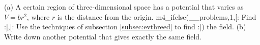 (a) A certain region of three-dimensional space has a potential that varies as
        $V=br^2$, where $r$ is the distance from the origin.
m4_ifelse(__problems,1,[:%
  Find
:],[:%
        Use the techniques of subsection \ref{subsec:evthreed}
        to find 
:])%
the field.\answercheck\hwendpart
        (b) Write down another potential that gives exactly the same field.
